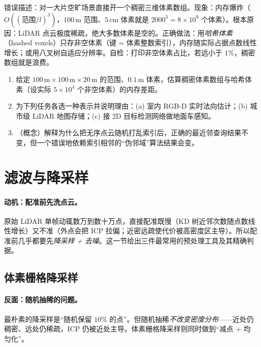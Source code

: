 \begin{pitfall}
错误描述：对一大片空旷场景直接开一个稠密三维体素数组。现象：内存爆炸（$O((\text{范围}/l)^3)$，$100\,\mathrm{m}$ 范围、$5\,\mathrm{cm}$ 体素就是 $2000^3=8\times10^9$ 个体素）。根本原因：LiDAR 点云极度稀疏，绝大多数体素是空的。正确做法：用\emph{哈希体素}（hashed voxels）只存非空体素（键 = 体素整数索引），内存随实际占据点数线性增长；或用八叉树自适应分辨率。自检：打印非空体素占比，若远小于 $1\%$，稠密数组就是浪费。
\end{pitfall}

\begin{practice}
\begin{enumerate}
  \item 给定 $100\,\mathrm{m}\times100\,\mathrm{m}\times20\,\mathrm{m}$ 的范围、$0.1\,\mathrm{m}$ 体素，估算稠密体素数组与哈希体素（设实际 $5\times10^4$ 个非空体素）的内存差距。
  \item 为下列任务各选一种表示并说明理由：(a) 室内 RGB-D 实时法向估计；(b) 城市级 LiDAR 地图存储；(c) 接 2D 目标检测网络做地面车感知。
  \item （概念）解释为什么把无序点云随机打乱索引后，正确的最近邻查询结果不变，但一个错误地依赖索引相邻的“伪邻域”算法结果会变。
\end{enumerate}
\end{practice}

\section{滤波与降采样}
\label{sec:pc-filter}

\paragraph{动机：配准前先洗点云。}
原始 LiDAR 单帧动辄数万到数十万点，直接配准既慢（KD 树近邻次数随点数线性增长）又不准（外点会把 ICP 拉偏；近密远疏使代价被高密度区主导）。所以配准前几乎都要先\emph{降采样 + 去噪}。这一节给出三件最常用的预处理工具及其精确判据。

\subsection{体素栅格降采样}
\label{sec:pc-voxel}

\paragraph{反面：随机抽稀的问题。}
最朴素的降采样是“随机保留 $10\%$ 的点”。但随机抽稀\emph{不改变密度分布}——近处仍稠密、远处仍稀疏，ICP 仍被近处主导。体素栅格降采样则同时做到“减点 + 均匀化”。


